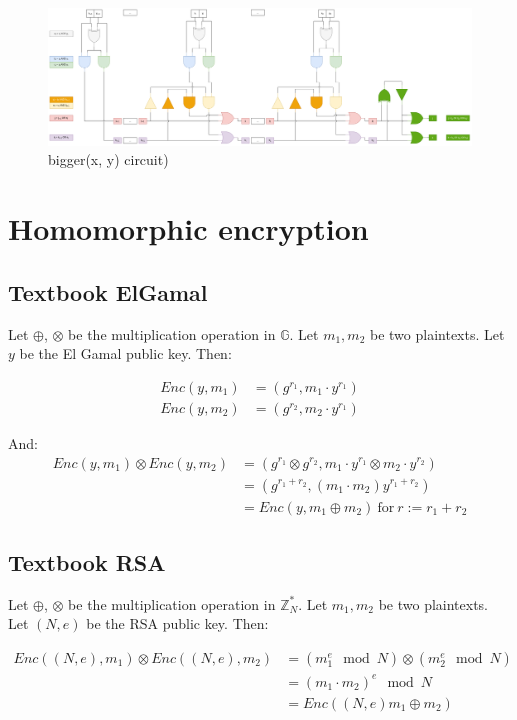 \documentclass[a4paper]{scrreprt}
\begin{document}
\begin{figure}[h]
        \centering
		\includegraphics[width=\textwidth]{1_circuit}
		\caption{bigger(x, y) circuit)}
		\label{fig:circuit}
\end{figure}


\section{Homomorphic encryption}

\subsection{Textbook ElGamal}

Let $\oplus$, $\otimes$ be the multiplication operation in $\mathbb{G}$. Let
$m_1, m_2$ be two plaintexts. Let $y$ be the El Gamal public key. Then:

\begin{align*}
		Enc(y, m_1) & = (g^{r_1}, m_1 \cdot y^{r_1}) \\
		Enc(y, m_2) & = (g^{r_2}, m_2 \cdot y^{r_1})
\end{align*}

And:
\begin{align*}
		Enc(y, m_1) \otimes Enc(y, m_2) & = (g^{r_1} \otimes g^{r_2}, m_1 \cdot y^{r_1} \otimes m_2 \cdot y^{r_2}) \\
										& = (g^{r_1 + r_2}, (m_1 \cdot m_2) y^{r_1 + r_2}) \\
										& = Enc(y, m_1 \oplus m_2)\ \text{for}\ r := r_1 + r_2
\end{align*}

\subsection{Textbook RSA}

Let $\oplus$, $\otimes$ be the multiplication operation in $\mathbb{Z}_N^{*}$.
Let $m_1, m_2$ be two plaintexts. Let $(N, e)$ be the RSA public key. Then:

\begin{align*}
		Enc((N, e), m_1) \otimes Enc((N, e), m_2) & = (m_1^e \mod N) \otimes (m_2^e \mod N) \\
												  & = (m_1 \cdot m_2)^e \mod N \\
												  & = Enc((N, e) m_1 \oplus m_2)
\end{align*}
\end{document}
